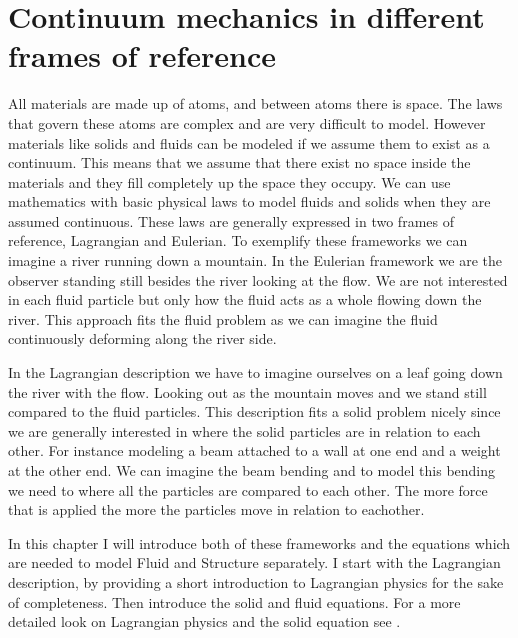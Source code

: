 \chapter{Continuum mechanics in different frames of reference}
All materials are made up of atoms, and between atoms there is space. The laws that govern these atoms are complex and are very difficult to model. However materials like solids and fluids can be modeled if we assume them to exist as a continuum. This means that we assume that there exist no space inside the materials and they fill completely up the space they occupy. 
We can use mathematics with basic physical laws to model fluids and solids when they are assumed continuous. These laws are generally expressed in two frames of reference, Lagrangian and Eulerian. To exemplify these frameworks we can imagine a river running down a mountain. In the Eulerian framework we are the observer standing still besides the river looking at the flow. We are not interested in each fluid particle but only how the fluid acts as a whole flowing down the river. This approach fits the fluid problem as we can imagine the fluid continuously deforming along the river side. \newline

In the Lagrangian description we have to imagine ourselves on a leaf going down the river with the flow. Looking out as the mountain moves and we stand still compared to the fluid particles. This description fits a solid problem nicely since we are generally interested in where the solid particles are in relation to each other. For instance modeling a beam attached to a wall at one end and a weight at the other end. We can imagine the beam bending and to model this bending we need to where all the particles are compared to each other. The more force that is applied the more the particles move in relation to eachother. \newline

In this chapter I will introduce both of these frameworks and the equations which are needed to model Fluid and Structure separately. I start with the Lagrangian description, by providing a short introduction to Lagrangian physics for the sake of completeness. Then introduce the solid and fluid equations. For a more detailed look on Lagrangian physics and the solid equation see \cite{Holzapfel2000}.





\begin{comment}
Let $\Omega \in \mathbb{R}^d $ for $d \in \{1,2\}$, be a bounded domain with boundary $ \partial \Omega$. The domain is made up of of two sub domains $ \mathcal{F} $ for the fluid domain, and $\mathcal{S}$ for the solid. The interface between the domains are denoted by $ \Sigma = \mathcal{F} \cap \mathcal{S} $. The reference or initial is denoted by $ \hat{\Sigma} = \hat{\mathcal{F}} \cap \hat{\mathcal{S}}  $ 
\end{comment}

